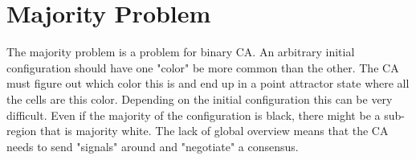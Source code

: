 \section{Majority Problem}
The majority problem is a problem for binary CA.
An arbitrary initial configuration should have one "color" be more common than the other.
The CA must figure out which color this is and end up in a point attractor state where all the cells are this color.
Depending on the initial configuration this can be very difficult.
Even if the majority of the configuration is black, there might be a sub-region that is majority white.
The lack of global overview means that the CA needs to send "signals" around and "negotiate" a consensus.
